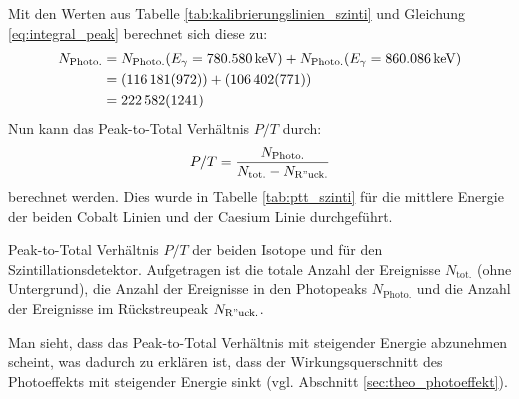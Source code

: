 \documentclass[11pt, a4paper]{article}
\numberwithin{equation}{section}
\newcommand{\co}{\isotope[60]{Co}}
\newcommand{\cs}{\isotope[137]{Cs}}
\begin{document}
Mit den Werten aus Tabelle \ref{tab:kalibrierungslinien_szinti} und Gleichung \eqref{eq:integral_peak} berechnet sich diese zu:
\begin{align*}
	N_\mathrm{Photo.} &= N_\mathrm{Photo.}(E_\gamma = \SI{780.580}{\kilo\electronvolt}) +  N_\mathrm{Photo.}(E_\gamma = \SI{860.086}{\kilo\electronvolt})\\
	&= (\num{116181 +- 972}) + (\num{106402 +- 771})\\
	&= \num{222582 +- 1241}
\end{align*}
Nun kann das Peak-to-Total Verhältnis $P/T$ durch:
\begin{align}
	\label{eq:ptt}
	P/T = \frac{N_\mathrm{Photo.}}{N_\mathrm{tot.} - N_\mathrm{R"uck.}}
\end{align}
berechnet werden.
Dies wurde in Tabelle \ref{tab:ptt_szinti} für die mittlere Energie der beiden Cobalt Linien und der Caesium Linie durchgeführt.
\begin{table}[ht]
	\centering
	\resizebox{\textwidth}{!}{
	
	}
	\caption{Peak-to-Total Verhältnis $P/T$ der beiden Isotope \co{} und \cs{} für den Szintillationsdetektor. Aufgetragen ist die totale Anzahl der Ereignisse $N_\mathrm{tot.}$ (ohne Untergrund), die Anzahl der Ereignisse in den Photopeaks $N_\mathrm{Photo.}$ und die Anzahl der Ereignisse im Rückstreupeak $N_\mathrm{R"uck.}$.}
	\label{tab:ptt_szinti}
\end{table}
Man sieht, dass das Peak-to-Total Verhältnis mit steigender Energie abzunehmen scheint, was dadurch zu erklären ist, dass der Wirkungsquerschnitt des Photoeffekts mit steigender Energie sinkt (vgl. Abschnitt \ref{sec:theo_photoeffekt}).
\end{document}

